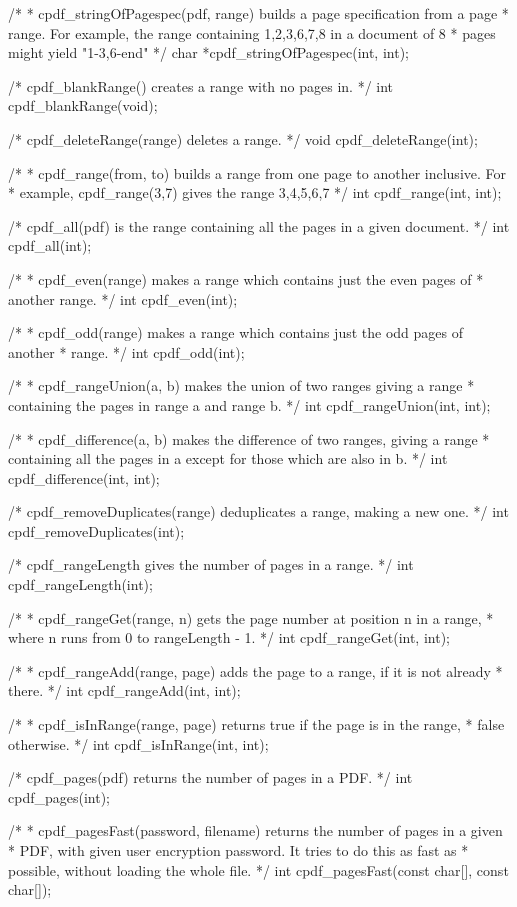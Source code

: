 /*
 * cpdf_stringOfPagespec(pdf, range) builds a page specification from a page
 * range. For example, the range containing 1,2,3,6,7,8 in a document of 8
 * pages might yield "1-3,6-end"
 */
char *cpdf_stringOfPagespec(int, int);

/* cpdf_blankRange() creates a range with no pages in. */
int cpdf_blankRange(void);

/* cpdf_deleteRange(range) deletes a range. */
void cpdf_deleteRange(int);

/*
 * cpdf_range(from, to) builds a range from one page to another inclusive. For
 * example, cpdf_range(3,7) gives the range 3,4,5,6,7
 */
int cpdf_range(int, int);

/* cpdf_all(pdf) is the range containing all the pages in a given document. */
int cpdf_all(int);

/*
 * cpdf_even(range) makes a range which contains just the even pages of
 * another range.
 */
int cpdf_even(int);

/*
 * cpdf_odd(range) makes a range which contains just the odd pages of another
 * range.
 */
int cpdf_odd(int);

/*
 * cpdf_rangeUnion(a, b) makes the union of two ranges giving a range
 * containing the pages in range a and range b.
 */
int cpdf_rangeUnion(int, int);

/*
 * cpdf_difference(a, b) makes the difference of two ranges, giving a range
 * containing all the pages in a except for those which are also in b.
 */
int cpdf_difference(int, int);

/* cpdf_removeDuplicates(range) deduplicates a range, making a new one. */
int cpdf_removeDuplicates(int);

/* cpdf_rangeLength gives the number of pages in a range. */
int cpdf_rangeLength(int);

/*
 * cpdf_rangeGet(range, n) gets the page number at position n in a range,
 * where n runs from 0 to rangeLength - 1.
 */
int cpdf_rangeGet(int, int);

/*
 * cpdf_rangeAdd(range, page) adds the page to a range, if it is not already
 * there.
 */
int cpdf_rangeAdd(int, int);

/*
 * cpdf_isInRange(range, page) returns true if the page is in the range,
 * false otherwise.
 */
int cpdf_isInRange(int, int);

/* cpdf_pages(pdf) returns the number of pages in a PDF. */
int cpdf_pages(int);

/*
 * cpdf_pagesFast(password, filename) returns the number of pages in a given
 * PDF, with given user encryption password. It tries to do this as fast as
 * possible, without loading the whole file.
 */
int cpdf_pagesFast(const char[], const char[]);

